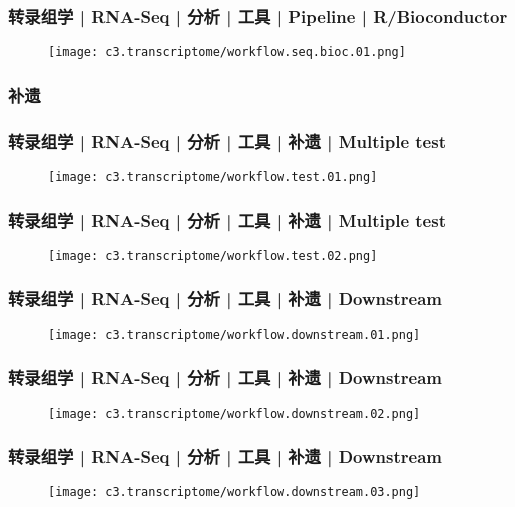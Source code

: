 \begin{frame}
  \frametitle{转录组学 | RNA-Seq | 分析 | 工具 | Pipeline | R/Bioconductor}
  \begin{figure}
    \centering
    \texttt{[image: c3.transcriptome/workflow.seq.bioc.01.png]}
  \end{figure}
\end{frame}

\subsubsection{补遗}
\begin{frame}
  \frametitle{转录组学 | RNA-Seq | 分析 | 工具 | 补遗 | Multiple test}
  \begin{figure}
    \centering
    \texttt{[image: c3.transcriptome/workflow.test.01.png]}
  \end{figure}
\end{frame}

\begin{frame}
  \frametitle{转录组学 | RNA-Seq | 分析 | 工具 | 补遗 | Multiple test}
  \begin{figure}
    \centering
    \texttt{[image: c3.transcriptome/workflow.test.02.png]}
  \end{figure}
\end{frame}

\begin{frame}
  \frametitle{转录组学 | RNA-Seq | 分析 | 工具 | 补遗 | Downstream}
  \begin{figure}
    \centering
    \texttt{[image: c3.transcriptome/workflow.downstream.01.png]}
  \end{figure}
\end{frame}

\begin{frame}
  \frametitle{转录组学 | RNA-Seq | 分析 | 工具 | 补遗 | Downstream}
  \begin{figure}
    \centering
    \texttt{[image: c3.transcriptome/workflow.downstream.02.png]}
  \end{figure}
\end{frame}

\begin{frame}
  \frametitle{转录组学 | RNA-Seq | 分析 | 工具 | 补遗 | Downstream}
  \begin{figure}
    \centering
    \texttt{[image: c3.transcriptome/workflow.downstream.03.png]}
  \end{figure}
\end{frame}

